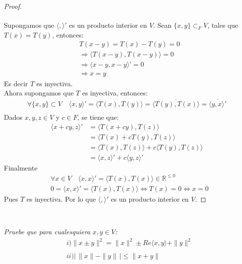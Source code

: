\documentclass[11pt,letterpaper]{article}
\newcommand{\R}{\mathbb{R}}
\begin{document}
\begin{proof}\,\\
	\,\\
    Supongamos que $\langle,\rangle'$ es un producto interior en $V$. Sean $\{ x,y\}\subset _FV$, tales que $T(x)=T(y)$, entonces:
\begin{align*}
    &T(x-y)=T(x)-T(y)=0\\
    &\Rightarrow \langle T(x-y),T(x-y) \rangle=0\\
    &\Rightarrow \langle x-y,x-y \rangle \text{'}=0 \\
    &\Rightarrow x=y
\end{align*}
Es decir $T$ es inyectiva.\\[10pt]
Ahora supongamos que $T$ es inyectiva, entonces:
\begin{align*}
   \forall \{x,y\}\subset V \quad \langle x,y \rangle'=\langle T(x),T(y) \rangle =\overline{\langle T(y),T(x) \rangle}=\overline{\langle y,x \rangle'}\\
\end{align*}
Dados $x,y,z\in V$ y $c\in F$, se tiene que:
\begin{align*}
    \langle x+cy,z \rangle'&=\langle T(x+cy),T(z) \rangle \\
    &=\langle T(x)+cT(y),T(z) \rangle \\
    &=\langle T(x),T(z) \rangle +c\langle T(y),T(z) \rangle \\
    &=\langle x,z \rangle' + c\langle y,z \rangle'
\end{align*}
Finalmente
\begin{align*}
     &\forall x\in V \quad \langle x,x \rangle'=\langle T(x),T(x) \rangle \in \R^{\leq 0}\\
     &0=\langle x,x \rangle'=\langle T(x),T(x) \rangle \Leftrightarrow T(x)=0 \Leftrightarrow x=0
\end{align*}
Pues $T$ es inyectiva. Por lo que $\langle,\rangle'$ es un producto interior en $V$.
\end{proof}\,\\
\begin{tcolorbox}[
	title = \textcolor{black}{\textcolor{white}{Problema 3}},]
\textit{Pruebe que para cualesquiera $x,y\in V$:\,\\
\begin{align*}
    &i)\|x\pm y\|^2=\|x\|^2\pm Re\langle x,y\rangle+\|y\|^2\,\\
    \,\\
    &ii)|\,\|x\|-\|y\|\,|\leq \|x+y\|
\end{align*}
}
\end{tcolorbox}
\end{document}
